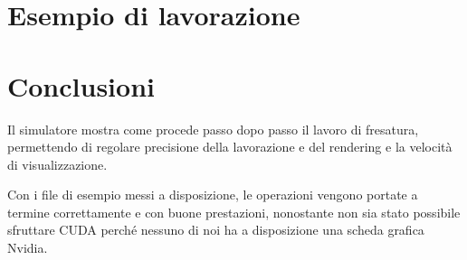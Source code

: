 \documentclass[10pt,a4paper,twoside,openright,titlepage,fleqn,%
               headinclude,,footinclude,BCOR5mm,%
               numbers=noenddot,cleardoublepage=empty,%
               tablecaptionabove]{scrreprt}
\begin{document}
\section{Esempio di lavorazione}

\section{Conclusioni}
Il simulatore mostra come procede passo dopo passo il lavoro di fresatura, permettendo di regolare precisione della lavorazione e del rendering e la velocità di visualizzazione.

Con i file di esempio messi a disposizione, le operazioni vengono portate a termine correttamente e con buone prestazioni, nonostante non sia stato possibile sfruttare CUDA perché nessuno di noi ha a disposizione una scheda grafica Nvidia.
\end{document}
